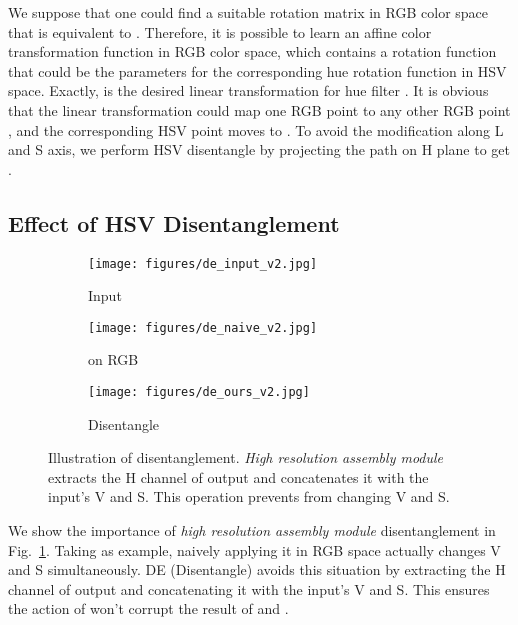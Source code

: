 \documentclass[runningheads]{llncs}
\begin{document}
   
   
   We suppose that one could find a suitable rotation matrix  in RGB color space that is equivalent to \cite{haeberli1993matrix}.
   Therefore, it is possible to learn an affine color transformation function  in RGB color space, which contains a rotation function  that could be the parameters for the corresponding hue rotation function  in HSV space.
   Exactly,  is the desired linear transformation for hue filter .
   It is obvious that the linear transformation  could map one RGB point  to any other RGB point , and the corresponding HSV point  moves to .
   To avoid the modification along L and S axis, we perform HSV disentangle by projecting the path  on H plane to get .
   
   
   \subsection{Effect of HSV Disentanglement}
   \label{disentangle}
   
   \begin{figure}[htbp]
   \centering
   
   \begin{subfigure}[t]{0.3\linewidth}
   \centering
   \texttt{[image: figures/de\_input\_v2.jpg]}
   \caption{Input}
   \end{subfigure}
   \begin{subfigure}[t]{0.3\linewidth}
   \centering
   \texttt{[image: figures/de\_naive\_v2.jpg]}
   \caption{ on RGB}
   \end{subfigure}
   \begin{subfigure}[t]{0.3\linewidth}
   \centering
   \texttt{[image: figures/de\_ours\_v2.jpg]}
   \caption{Disentangle}
   \end{subfigure}
   
   \caption{Illustration of disentanglement.
   \textit{High resolution assembly module} extracts the H channel of output and concatenates it with the input's V and S. This operation prevents  from changing V and S.
   }
   \label{fig:disentangle}
   \end{figure}
   
   We show the importance of \textit{high resolution assembly module} disentanglement in Fig.~\ref{fig:disentangle}.
   Taking  as example, naively applying it in RGB space actually changes V and S simultaneously. 
   DE (Disentangle) avoids this situation by extracting the H channel of output and concatenating it with the input's V and S. This ensures the action of  won't corrupt the result of  and .
   
\end{document}

